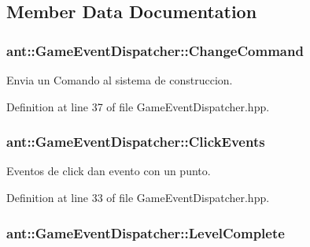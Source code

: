 \subsection{Member Data Documentation}
\hypertarget{classant_1_1_game_event_dispatcher_a4ad76b52e706a61ca46d274b9fb50269}{
\subsubsection[{Change\+Command}]{ ant\+::\+Game\+Event\+Dispatcher\+::\+Change\+Command}}\label{classant_1_1_game_event_dispatcher_a4ad76b52e706a61ca46d274b9fb50269}


Envia un Comando al sistema de construccion. 



Definition at line 37 of file Game\+Event\+Dispatcher.\+hpp.

\hypertarget{classant_1_1_game_event_dispatcher_ac3aff44451719b319fbdd9cbba0e9e96}{
\subsubsection[{Click\+Events}]{ ant\+::\+Game\+Event\+Dispatcher\+::\+Click\+Events}}\label{classant_1_1_game_event_dispatcher_ac3aff44451719b319fbdd9cbba0e9e96}


Eventos de click dan evento con un punto. 



Definition at line 33 of file Game\+Event\+Dispatcher.\+hpp.

\hypertarget{classant_1_1_game_event_dispatcher_a0ea1a629f7efdd3f7002530c6148c7e3}{
\subsubsection[{Level\+Complete}]{ ant\+::\+Game\+Event\+Dispatcher\+::\+Level\+Complete}}\label{classant_1_1_game_event_dispatcher_a0ea1a629f7efdd3f7002530c6148c7e3}



